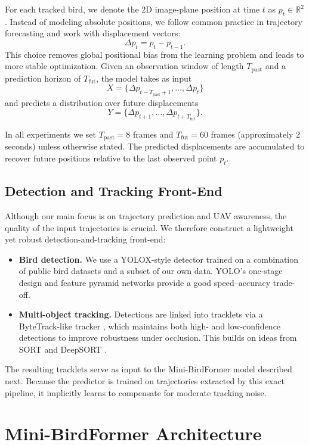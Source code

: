 \documentclass[journal]{IEEEtran}
\begin{document}
For each tracked bird, we denote the 2D image-plane position at time $t$ as $p_t \in \mathbb{R}^2$. Instead of modeling absolute positions, we follow common practice in trajectory forecasting and work with displacement vectors:
\[
\Delta p_t = p_t - p_{t-1}.
\]
This choice removes global positional bias from the learning problem and leads to more stable optimization. Given an observation window of length $T_{\text{past}}$ and a prediction horizon of $T_{\text{fut}}$, the model takes as input
\[
X = \{\Delta p_{t-T_{\text{past}}+1}, \ldots, \Delta p_{t}\}
\]
and predicts a distribution over future displacements
\[
Y = \{\Delta p_{t+1}, \ldots, \Delta p_{t+T_{\text{fut}}}\}.
\]

In all experiments we set $T_{\text{past}} = 8$ frames and $T_{\text{fut}} = 60$ frames (approximately 2 seconds) unless otherwise stated. The predicted displacements are accumulated to recover future positions relative to the last observed point $p_t$.

\subsection{Detection and Tracking Front-End}

Although our main focus is on trajectory prediction and UAV awareness, the quality of the input trajectories is crucial. We therefore construct a lightweight yet robust detection-and-tracking front-end:

\begin{itemize}
	\item \textbf{Bird detection.} We use a YOLOX-style detector \cite{Ge2021YOLOX} trained on a combination of public bird datasets and a subset of our own data. YOLO's one-stage design \cite{Redmon2016YOLO} and feature pyramid networks \cite{Lin2017FPN} provide a good speed--accuracy trade-off.
	\item \textbf{Multi-object tracking.} Detections are linked into tracklets via a ByteTrack-like tracker \cite{Zhang2021ByteTrack}, which maintains both high- and low-confidence detections to improve robustness under occlusion. This builds on ideas from SORT and DeepSORT \cite{Bewley2016SORT,Wojke2017DeepSORT}.
\end{itemize}

The resulting tracklets serve as input to the Mini-BirdFormer model described next. Because the predictor is trained on trajectories extracted by this exact pipeline, it implicitly learns to compensate for moderate tracking noise.
\section{Mini-BirdFormer Architecture}
\label{sec:architecture}
\end{document}
